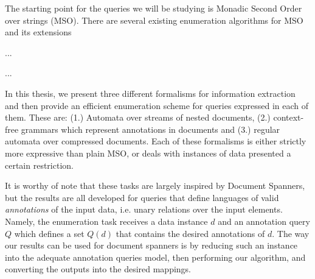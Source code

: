 The starting point for the queries we will be studying is Monadic Second Order over strings (MSO). There are several existing enumeration algorithms for MSO and its extensions

...

...

In this thesis, we present three different formalisms for information extraction and then provide an efficient enumeration scheme for queries expressed in each of them. 
These are: (1.) Automata over streams of nested documents, (2.) context-free grammars which represent annotations in documents and (3.) regular automata over compressed documents. 
Each of these formalisms is either strictly more expressive than plain MSO, or deals with instances of data presented a certain restriction.

It is worthy of note that these tasks are largely inspired by Document Spanners, but the results are all developed for queries that define languages of valid {\it annotations} of the input data, i.e. unary relations over the input elements. Namely, the enumeration task receives a data instance $d$ and an annotation query $Q$ which defines a set $Q(d)$ that contains the desired annotations of $d$. The way our results can be used for document spanners is by reducing such an instance into the adequate annotation queries model, then performing our algorithm, and converting the outputs into the desired mappings.







